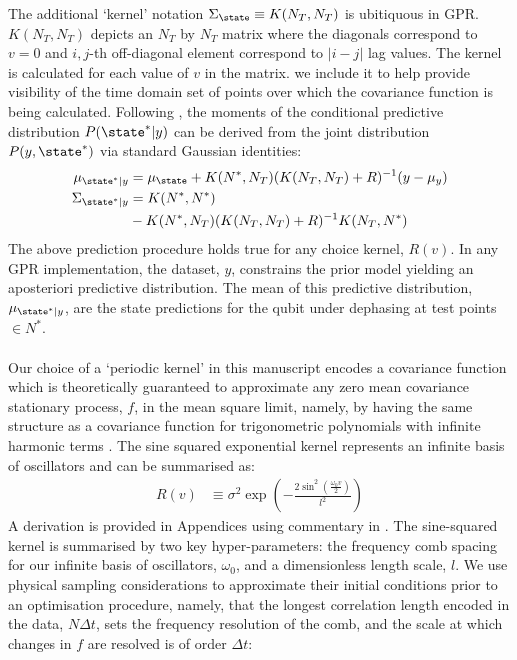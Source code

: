 The additional `kernel' notation $\Sigma_\state  \equiv K(N_T, N_T)$ is ubitiquous in GPR. $K(N_T, N_T)$ depicts an $N_T$ by $N_T$ matrix where the diagonals correspond to $v=0$ and $i, j$-th off-diagonal element correspond to $|i-j|$ lag values. The kernel is calculated for each value of $v$ in the matrix.  we include it to help provide visibility of the time domain set of points over which the covariance function is being calculated. Following \cite{rasmussen2005gaussian}, the moments of the conditional predictive distribution $P(\state^*|y)$ can be derived from the joint distribution $P(y,\state^*)$ via standard Gaussian identities:
\begin{align}
\mu_{\state^*|y} &= \mu_\state + K(N^*,N_T)(K(N_T,N_T) + R )^{-1} (y - \mu_y) \\
\Sigma_{\state^*|y} &= K(N^*,N^*) \nonumber \\
& - K(N^*,N_T)(K(N_T, N_T) + R)^{-1}K(N_T,N^*) 
\end{align}
The above prediction procedure holds true for any choice kernel, $R(v)$. In any GPR implementation, the dataset, $y$, constrains the prior model yielding an aposteriori predictive distribution. The mean of this predictive distribution, $\mu_{\state^*|y}$, are the state predictions for the qubit under dephasing at test points $\in N^*$.
\\
\\
Our choice of a `periodic kernel' in this manuscript encodes a covariance function which is theoretically guaranteed to approximate any zero mean covariance stationary process, $f$, in the mean square limit, namely, by having the same structure as a covariance function for trigonometric polynomials with infinite harmonic terms \cite{solin2014explicit, karlin2012first}. The sine squared exponential kernel represents an infinite basis of oscillators and can be summarised as:
\begin{align}
R(v) &\equiv \sigma^2 \exp (- \frac{2\sin^2(\frac{\omega_0 v}{2})}{l^2}) 
\end{align} A derivation is provided in Appendices using commentary in \cite{solin2014explicit}.
The sine-squared kernel is summarised by two key hyper-parameters: the frequency comb spacing for our infinite basis of oscillators, $\omega_0$, and a dimensionless length scale, $l$. We use physical sampling considerations to approximate their initial conditions prior to an optimisation procedure, namely, that the longest correlation length encoded in the data, $N \Delta t $, sets the frequency resolution of the comb, and the scale at which changes in $f$ are resolved is of order  $\Delta t$:
